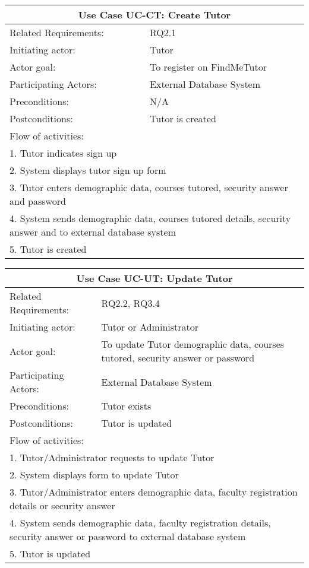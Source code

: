\documentclass[12pt]{article}
\begin{document}
{		\begin{tabular}{| l | l| }
		
			\hline\multicolumn{2}{|c|}{ \textbf{Use Case UC-CT: Create Tutor}} \\ \hline
			Related Requirements: & RQ2.1 \\ \hline
			Initiating actor: & Tutor \\ \hline
			Actor goal: & To register on FindMeTutor\\ \hline
			Participating Actors: & External Database System\\ \hline
			Preconditions: & N/A\\ \hline
			Postconditions: & Tutor is created\\ \hline
			\multicolumn{2}{|l|}{Flow of activities:}\\ \hline
			\multicolumn{2}{|p{15cm}|}{1. Tutor indicates sign up}\\
			\multicolumn{2}{|p{15cm}|}{2. System displays tutor sign up form}\\
			\multicolumn{2}{|p{15cm}|}{3. Tutor enters demographic data, courses tutored, security answer and password}	\\		
			\multicolumn{2}{|p{15cm}|}{4. System sends demographic data, courses tutored details, security answer and to external database system}\\
			\multicolumn{2}{|l|}{5. Tutor is created}	
			\\ \hline		
		\end{tabular}
		
		\begin{tabular}{| l | p{10cm}| }
			\hline\multicolumn{2}{|c|}{ \textbf{Use Case UC-UT: Update Tutor}} \\ \hline
			Related Requirements: & RQ2.2, RQ3.4 \\ \hline
			Initiating actor: & Tutor or Administrator \\ \hline
			Actor goal: & To update Tutor demographic data, courses tutored, security answer or password\\ \hline
			Participating Actors: & External Database System\\ \hline
			Preconditions:& Tutor exists\\ \hline
			Postconditions: & Tutor is updated\\ \hline
			\multicolumn{2}{|l|}{Flow of activities:}\\ \hline
			\multicolumn{2}{|p{15cm}|}{1. Tutor/Administrator requests to update Tutor}\\
			\multicolumn{2}{|p{15cm}|}{2. System displays form to update Tutor}\\
			\multicolumn{2}{|p{15cm}|}{3. Tutor/Administrator enters demographic data, faculty registration details or security answer}	\\		
			\multicolumn{2}{|p{15cm}|}{4. System sends demographic data, faculty registration details, security answer or password to external database system}\\
			\multicolumn{2}{|l|}{5. Tutor is updated}	
			\\ \hline		
		\end{tabular}

}
\end{document}
